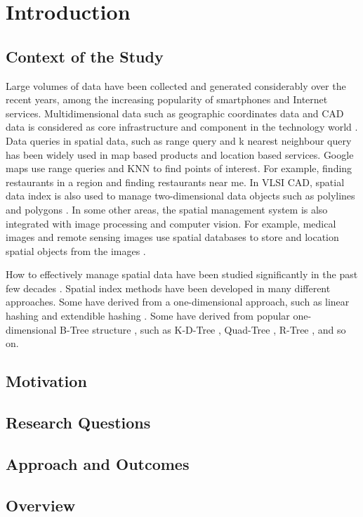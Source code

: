 \chapter{Introduction}

\section{Context of the Study}
Large volumes of data have been collected and generated considerably over the recent years, among the increasing popularity of smartphones and Internet services. Multidimensional data such as geographic coordinates data and CAD data is considered as core infrastructure and component in the technology world \cite{gunther1990research, morton1966computer}. Data queries in spatial data, such as range query and k nearest neighbour query has been widely used in map based products and location based services. Google maps use range queries and KNN to find points of interest. For example, finding restaurants in a region and finding restaurants near me. In VLSI CAD, spatial data index is also used to manage two-dimensional data objects such as polylines and polygons \cite{liu1994evaluation}. In some other areas, the spatial management system is also integrated with image processing and computer vision. For example, medical images and remote sensing images use spatial databases to store and location spatial objects from the images \cite{borah2004improved, adhikary1996knowledge, mantel2004matching, tagare1997medical}. 

How to effectively manage spatial data have been studied significantly in the past few decades \cite{Gaede:1998fp, ooi1990efficient}. Spatial index methods have been developed in many different approaches. Some have derived from a one-dimensional approach, such as linear hashing \cite{larson1980linear} and extendible hashing \cite{fagin1979extendible}. Some have derived from popular one-dimensional B-Tree structure \cite{Bayer:2002ds}, such as K-D-Tree \cite{Bentley:1975gn}, Quad-Tree \cite{CSUR:tm}, R-Tree \cite{Guttman:1984ka}, and so on. 


\section{Motivation}

\section{Research Questions}

\section{Approach and Outcomes}

\section{Overview}